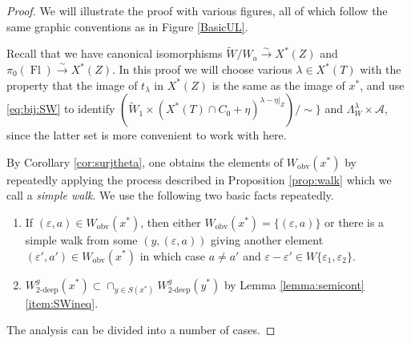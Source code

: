 \documentclass[oneside,a4paper,english, 11pt]{amsart}
\theoremstyle{plain}
\theoremstyle{plain}
\theoremstyle{plain}
\theoremstyle{plain}
\theoremstyle{plain}
\theoremstyle{plain}
\theoremstyle{definition}
\theoremstyle{definition}
\theoremstyle{definition}
\theoremstyle{remark}
\numberwithin{equation}{section}
\newcommand{\cA}{\mathcal{A}}
\newcommand{\eps}{\varepsilon}
\newcommand{\un}[1]{\underline{#1}}
\newcommand{\tld}[1]{\widetilde{#1}}
\DeclareMathOperator{\Fl}{Fl}
\newcommand{\ra}{\rightarrow}
\begin{document}
\begin{proof}
%
We will illustrate the proof with various figures, all of which follow the same graphic conventions as in Figure \ref{BasicUL}.

Recall that we have canonical isomorphisms $\tld{W}/W_a\stackrel{\sim}{\ra}X^*(Z)$ and $\pi_0(\Fl)\stackrel{\sim}{\ra}X^*(Z)$.
In this proof we will choose various $\lambda \in X^*(T)$ with the property that the image of $t_\lambda$ in $X^*(Z)$ is the same as the image of $x^*$, and use \eqref{eq:bij:SW} to identify $(\tld{W}_1 \times (X^*(T) \cap C_0 +\eta)^{\lambda-\eta|_{\un{Z}}})/\sim\}$ and $\Lambda_W^{\lambda} \times \cA$, since the latter set is more convenient to work with here. 



%
%

By Corollary \ref{cor:surjtheta}, one obtains the elements of $W_{\mathrm{obv}}(x^*)$ by repeatedly applying the process described in Proposition \ref{prop:walk} which we call a \emph{simple walk}. 
We use the following two basic facts repeatedly. 
\begin{enumerate}[label=(\roman*)]
\item \label{item:adjacent} If $(\eps,a) \in W_{\mathrm{obv}}(x^*)$, then either $W_{\mathrm{obv}}(x^*) = \{(\eps,a)\}$ or there is a simple walk from some $(y,(\eps,a))$ giving another element $(\eps',a') \in W_{\mathrm{obv}}(x^*)$ in which case $a \neq a'$ and $\eps-\eps' \in W\{\eps_1,\eps_2\}$. 
%
\item \label{item:upperbound} $W^g_{2\textrm{-deep}}(x^*) \subset \cap_{y\in S(x^*)} W^g_{2\textrm{-deep}}(y^*)$ by Lemma \ref{lemma:semicont}\eqref{item:SWineq}.
\end{enumerate}

%
%
%

The analysis can be divided into a number of cases.


\end{proof}
\end{document}
